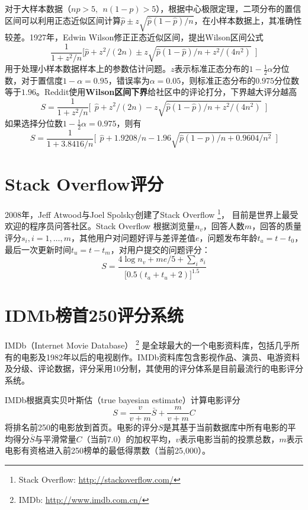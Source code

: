 对于大样本数据（$np > 5,~~n(1 - p) > 5$），根据中心极限定理，二项分布的置信区间可以利用正态近似区间计算$\hat{p}\pm z\sqrt{\hat{p}(1-\hat{p})/n}$，在小样本数据上，其准确性较差。1927年，Edwin Wilson\cite{wilson1927probable}修正正态近似区间，提出Wilson区间公式
\begin{equation}
  \frac{1}{1 + z^2/n} \Big[\hat p + z^2/(2n) \pm z \sqrt{\hat p (1 - \hat p)/n + z^2/(4n^2)}~~\Big]
\end{equation}
用于处理小样本数据样本上的参数估计问题。$z$表示标准正态分布的$1-\frac{1}{2}\alpha$分位数，对于置信度$1-\alpha=0.95$，错误率为$\alpha=0.05$，则标准正态分布的$0.975$分位数等于$1.96$。Reddit使用\textbf{Wilson区间下界}给社区中的评论打分，下界越大评分越高
\begin{equation}
    S = \frac{1}{1 + z^2/n} \Big[~~\hat p + z^2/(2n) - z \sqrt{\hat p (1 - \hat p)/n + z^2/(4n^2)}~~\Big]
\end{equation}
如果选择分位数$1-\frac{1}{2}\alpha=0.975$，则有
\begin{equation}
    S = \frac{1}{1 + 3.8416/n} \Big[~~\hat p + 1.9208/n - 1.96 \sqrt{\hat p (1 - \hat p)/n + 0.9604/n^2}~~\Big]
\end{equation}

\section{Stack Overflow评分}
2008年，Jeff Atwood与Joel Spolsky创建了Stack Overflow
\footnote{Stack Overflow: \href{http://stackoverflow.com/}{http://stackoverflow.com/}}，
目前是世界上最受欢迎的程序员问答社区。Stack Overflow 根据浏览量$n_v$，回答人数$m$，回答的质量评分$s_i,i=1,\ldots,m$，其他用户对问题好评与差评差值$e$，问题发布年龄$t_a = t-t_0$，最后一次更新时间$t_u = t-t_m$，对用户提交的问题评分：
\begin{equation}
    S = \frac{4 \log n_v + m e/5 +\sum\limits_i s_i}{\big[0.5(t_a + t_u + 2)\big]^{1.5}}
\end{equation}

\section{IDMb榜首250评分系统}
IMDb（Internet Movie Database）
\footnote{IMDb: \href{http://www.imdb.com.cn/}{http://www.imdb.com.cn/}}
是全球最大的一个电影资料库，包括几乎所有的电影及1982年以后的电视剧作。IMDb资料库包含影视作品、演员、电游资料及分级、评论数据，评分采用10分制，其使用的评分体系是目前最流行的电影评分系统。

IMDb根据真实贝叶斯估（true bayesian estimate）计算电影评分
\begin{equation}
    S = \frac{v}{v + m} \bar S + \frac{m}{v + m} C
\end{equation}
将排名前250的电影放到首页。电影的评分$S$是其基于当前数据库中所有电影的平均得分$\bar S$与平滑常量$C$（当前7.0）的加权平均，$v$表示电影当前的投票总数，$m$表示电影有资格进入前250榜单的最低得票数（当前25,000）。


